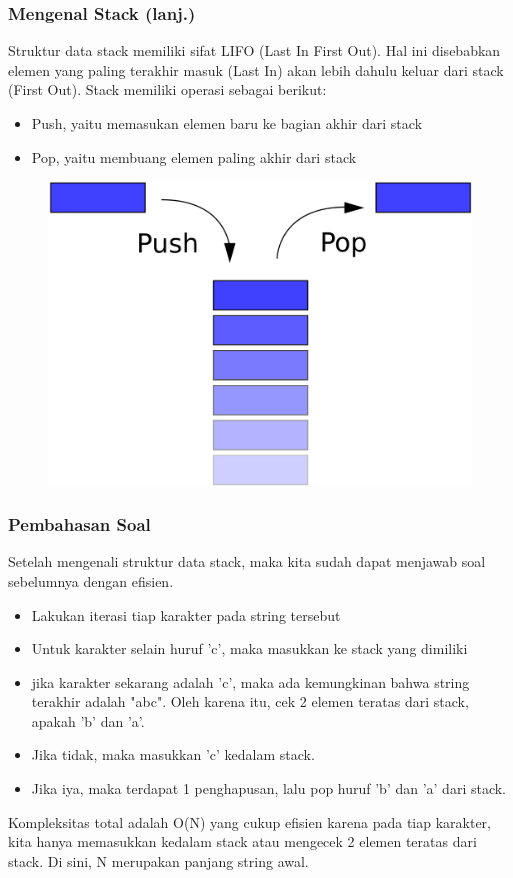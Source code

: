 \begin{frame}
\frametitle{Mengenal Stack (lanj.)}

Struktur data stack memiliki sifat LIFO (Last In First Out). Hal ini disebabkan elemen yang paling terakhir masuk (Last In) akan lebih dahulu keluar dari stack (First Out).\newline\newline
Stack memiliki operasi sebagai berikut:
\begin{itemize}
  \item Push, yaitu memasukan elemen baru ke bagian akhir dari stack
  \item Pop, yaitu membuang elemen paling akhir dari stack
\end{itemize}

\begin{figure}
  \centering
  \includegraphics[width=4 cm]{asset/stack.png}
\end{figure}

\end{frame}

\begin{frame}
\frametitle{Pembahasan Soal}

Setelah mengenali struktur data stack, maka kita sudah dapat menjawab soal sebelumnya dengan efisien.
\begin{itemize}
  \item Lakukan iterasi tiap karakter pada string tersebut
  \item Untuk karakter selain huruf 'c', maka masukkan ke stack yang dimiliki
  \item jika karakter sekarang adalah 'c', maka ada kemungkinan bahwa string terakhir adalah "abc". Oleh karena itu, cek 2 elemen teratas dari stack, apakah 'b' dan 'a'.
  \item Jika tidak, maka masukkan 'c' kedalam stack.
  \item Jika iya, maka terdapat 1 penghapusan, lalu pop huruf 'b' dan 'a' dari stack.
\end{itemize}
Kompleksitas total adalah O(N) yang cukup efisien karena pada tiap karakter, kita hanya memasukkan kedalam stack atau mengecek 2 elemen teratas dari stack. Di sini, N merupakan panjang string awal.
\end{frame}

